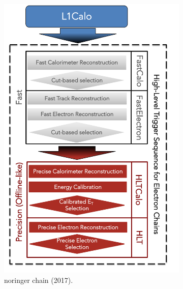 \begin{figure}[h!tb]
  \begin{center}
  \begin{subfigure}[c]{.48\textwidth}
  \centering
  \includegraphics[width=\textwidth]{sections/02_context/figures/ElectronChain_Run2_cutbased.pdf}
  \caption{noringer chain (2017).}
  \end{subfigure}
  \hfill
  \begin{subfigure}[c]{.48\textwidth}
  \centering

\end{subfigure}
\end{center}
\end{figure}
